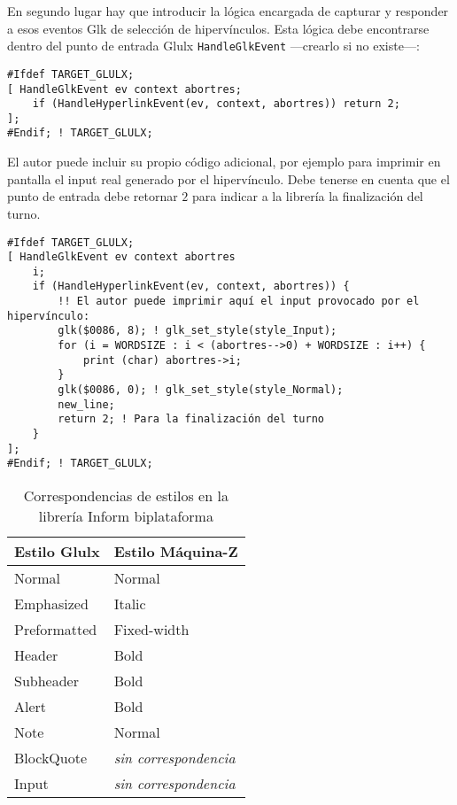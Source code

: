 \documentclass[a4paper,12pt]{article}
\numberwithin{equation}{section}
\begin{document}
En segundo lugar hay que introducir la lógica encargada de capturar y responder a esos eventos Glk de selección de hipervínculos. Esta lógica debe encontrarse dentro del punto de entrada Glulx \verb|HandleGlkEvent| ---crearlo si no existe---:

\begin{verbatim}
#Ifdef TARGET_GLULX;
[ HandleGlkEvent ev context abortres;
	if (HandleHyperlinkEvent(ev, context, abortres)) return 2;
];
#Endif; ! TARGET_GLULX;
\end{verbatim}

El autor puede incluir su propio código adicional, por ejemplo para imprimir en pantalla el input real generado por el hipervínculo. Debe tenerse en cuenta que el punto de entrada debe retornar $2$ para indicar a la librería la finalización del turno.

\begin{verbatim}
#Ifdef TARGET_GLULX;
[ HandleGlkEvent ev context abortres
	i;
	if (HandleHyperlinkEvent(ev, context, abortres)) {
		!! El autor puede imprimir aquí el input provocado por el hipervínculo:
		glk($0086, 8); ! glk_set_style(style_Input);
		for (i = WORDSIZE : i < (abortres-->0) + WORDSIZE : i++) {
			print (char) abortres->i;
		}
		glk($0086, 0); ! glk_set_style(style_Normal);
		new_line;
		return 2; ! Para la finalización del turno
	}
];
#Endif; ! TARGET_GLULX;
\end{verbatim}







\begin{table}[]
\centering
\begin{tabular}{ll}
\hline
\textbf{Estilo Glulx}	& \textbf{Estilo Máquina-Z}		\\ \hline
Normal					& Normal						\\
Emphasized				& Italic						\\
Preformatted			& Fixed-width					\\
Header					& Bold							\\
Subheader				& Bold							\\
Alert					& Bold							\\
Note					& Normal						\\
BlockQuote				& \emph{sin correspondencia}	\\
Input					& \emph{sin correspondencia}	\\ \hline
\end{tabular}
\caption{Correspondencias de estilos en la librería Inform biplataforma}
\label{table:correspondencias-estilos-glulx-z}
\end{table}
\end{document}
